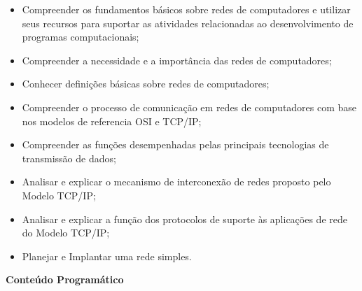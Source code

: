 \begin{itemize}

\item Compreender os fundamentos básicos sobre redes de computadores e utilizar seus recursos para suportar as atividades relacionadas ao desenvolvimento de programas computacionais;
\item Compreender a necessidade e a importância das redes de computadores;
\item Conhecer definições básicas sobre redes de computadores;
\item Compreender o processo de comunicação em redes de computadores com base nos modelos de referencia OSI e TCP/IP;
\item Compreender as funções desempenhadas pelas principais tecnologias de transmissão de dados;
\item Analisar e explicar o mecanismo de interconexão de redes proposto pelo Modelo TCP/IP;
\item Analisar e explicar a função dos protocolos de suporte às aplicações de rede do Modelo TCP/IP;
\item Planejar e Implantar uma rede simples.

\end{itemize} 


\begin{snugshade}\begin{center}\textbf{
    Conteúdo Programático
}\end{center}\end{snugshade}

